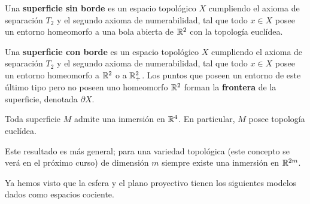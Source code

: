 \documentclass[GTS.tex]{subfiles}
\begin{document}
\begin{defi} Una \textbf{superficie sin borde} es un espacio topológico $X$ cumpliendo el axioma de separación $T_2$ y el segundo axioma de numerabilidad, tal que todo $x\in X$ posee un entorno homeomorfo a una bola abierta de $\mathbb{R}^2$ con la topología euclídea.
\end{defi}

\begin{defi} Una \textbf{superficie con borde} es un espacio topológico $X$ cumpliendo el axioma de separación $T_2$ y el segundo axioma de numerabilidad, tal que todo $x\in X$ posee un entorno homeomorfo a $\mathbb{R}^2$ o a $\mathbb{R}^2_+$. Los puntos que poseen un entorno de este último tipo pero no poseen uno homeomorfo $\mathbb{R}^2$ forman la \textbf{frontera} de la superficie, denotada $\partial X$.
\end{defi}

\begin{teorema} Toda superficie $M$ admite una inmersión en $\mathbb{R}^4$. En particular, $M$ posee topología euclídea. 
\end{teorema}

\begin{nota} Este resultado es más general; para una variedad topológica (este concepto se verá en el próximo curso) de dimensión $m$ siempre existe una inmersión en $\mathbb{R}^{2m}$.
\end{nota}



Ya hemos visto que la esfera y el plano proyectivo tienen los siguientes modelos dados como espacios cociente.
\end{document}
